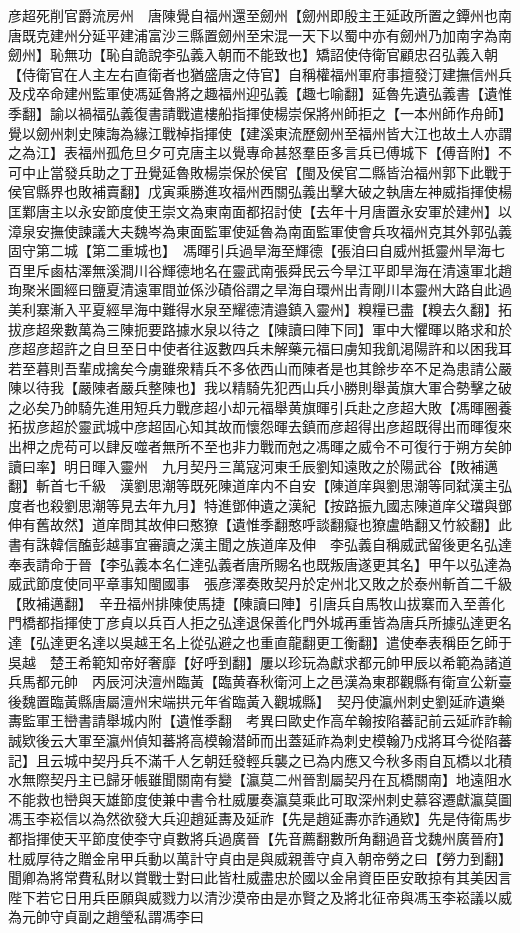 彦超死削官爵流房州　唐陳覺自福州還至劒州【劒州即殷主王延政所置之鐔州也南唐既克建州分延平建浦富沙三縣置劒州至宋混一天下以蜀中亦有劒州乃加南字為南劒州】恥無功【恥自詭說李弘義入朝而不能致也】矯詔使侍衛官顧忠召弘義入朝【侍衛官在人主左右直衛者也猶盛唐之侍官】自稱權福州軍府事擅發汀建撫信州兵及戍卒命建州監軍使馮延魯將之趣福州迎弘義【趣七喻翻】延魯先遺弘義書【遺惟季翻】諭以禍福弘義復書請戰遣樓船指揮使楊崇保將州師拒之【一本州師作舟師】覺以劒州刺史陳誨為緣江戰棹指揮使【建溪東流歷劒州至福州皆大江也故土人亦謂之為江】表福州孤危旦夕可克唐主以覺專命甚怒羣臣多言兵已傅城下【傅音附】不可中止當發兵助之丁丑覺延魯敗楊崇保於侯官【閩及侯官二縣皆治福州郭下此戰于侯官縣界也敗補賣翻】戊寅乘勝進攻福州西關弘義出擊大破之執唐左神威指揮使楊匡鄴唐主以永安節度使王崇文為東南面都招討使【去年十月唐置永安軍於建州】以漳泉安撫使諫議大夫魏岑為東面監軍使延魯為南面監軍使會兵攻福州克其外郭弘義固守第二城【第二重城也】　馮暉引兵過旱海至輝德【張洎曰自威州抵靈州旱海七百里斥鹵枯澤無溪澗川谷輝德地名在靈武南張舜民云今旱江平即旱海在清遠軍北趙珣聚米圖經曰鹽夏清遠軍間並係沙磧俗謂之旱海自環州出青剛川本靈州大路自此過美利寨漸入平夏經旱海中難得水泉至耀德清邉鎮入靈州】糗糧已盡【糗去久翻】拓拔彦超衆數萬為三陳扼要路據水泉以待之【陳讀曰陣下同】軍中大懼暉以賂求和於彦超彦超許之自旦至日中使者往返數四兵未解藥元福曰虜知我飢渇陽許和以困我耳若至暮則吾輩成擒矣今虜雖衆精兵不多依西山而陳者是也其餘步卒不足為患請公嚴陳以待我【嚴陳者嚴兵整陳也】我以精騎先犯西山兵小勝則舉黃旗大軍合勢擊之破之必矣乃帥騎先進用短兵力戰彦超小却元福舉黄旗暉引兵赴之彦超大敗【馮暉圈養拓拔彦超於靈武城中彦超固心知其故而懷怨暉去鎮而彦超得出彦超既得出而暉復來出柙之虎苟可以肆反噬者無所不至也非力戰而尅之馮暉之威令不可復行于朔方矣帥讀曰率】明日暉入靈州　九月契丹三萬寇河東壬辰劉知遠敗之於陽武谷【敗補邁翻】斬首七千級　漢劉思潮等既死陳道庠内不自安【陳道庠與劉思潮等同弑漢主弘度者也殺劉思潮等見去年九月】特進鄧伸遺之漢紀【按路振九國志陳道庠父璫與鄧伸有舊故然】道庠問其故伸曰憨獠【遺惟季翻憨呼談翻癡也獠盧皓翻又竹絞翻】此書有誅韓信醢彭越事宜審讀之漢主聞之族道庠及伸　李弘義自稱威武留後更名弘達奉表請命于晉【李弘義本名仁達弘義者唐所賜名也既叛唐遂更其名】甲午以弘達為威武節度使同平章事知閩國事　張彦澤奏敗契丹於定州北又敗之於泰州斬首二千級【敗補邁翻】　辛丑福州排陳使馬捷【陳讀曰陣】引唐兵自馬牧山拔寨而入至善化門橋都指揮使丁彦貞以兵百人拒之弘達退保善化門外城再重皆為唐兵所據弘達更名達【弘達更名達以吳越王名上從弘避之也重直龍翻更工衡翻】遣使奉表稱臣乞師于吳越　楚王希範知帝好奢靡【好呼到翻】屢以珍玩為獻求都元帥甲辰以希範為諸道兵馬都元帥　丙辰河決澶州臨黃【臨黄春秋衛河上之邑漢為東郡觀縣有衛宣公新臺後魏置臨黃縣唐屬澶州宋端拱元年省臨黃入觀城縣】　契丹使瀛州刺史劉延祚遺樂夀監軍王巒書請舉城内附【遺惟季翻　考異曰歐史作高牟翰按陷蕃記前云延祚詐輸誠欵後云大軍至瀛州偵知蕃將高模翰潜師而出蓋延祚為刺史模翰乃戍將耳今從陷蕃記】且云城中契丹兵不滿千人乞朝廷發輕兵襲之已為内應又今秋多雨自瓦橋以北積水無際契丹主已歸牙帳雖聞關南有變【瀛莫二州晉割屬契丹在瓦橋關南】地遠阻水不能救也巒與天雄節度使兼中書令杜威屢奏瀛莫乘此可取深州刺史慕容遷獻瀛莫圖馮玉李崧信以為然欲發大兵迎趙延夀及延祚【先是趙延夀亦詐通欵】先是侍衛馬步都指揮使天平節度使李守貞數將兵過廣晉【先音薦翻數所角翻過音戈魏州廣晉府】杜威厚待之贈金帛甲兵動以萬計守貞由是與威親善守貞入朝帝勞之曰【勞力到翻】聞卿為將常費私財以賞戰士對曰此皆杜威盡忠於國以金帛資臣臣安敢掠有其美因言陛下若它日用兵臣願與威戮力以清沙漠帝由是亦賢之及將北征帝與馮玉李崧議以威為元帥守貞副之趙瑩私謂馮李曰